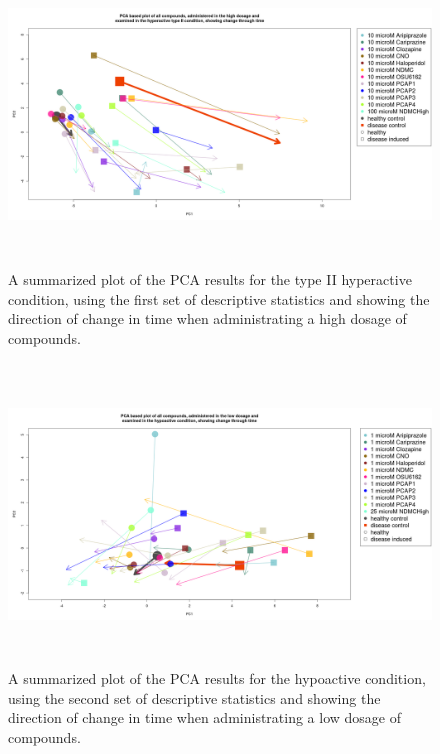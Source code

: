 \documentclass[a4paper,12pt]{article}
\begin{document}
\newpage
\begin{figure}[h!]
\begin{center}
\includegraphics[width=16cm,height=8cm]{All_together_10_microM_DarkPTZ_in_time.png}
\caption{A summarized plot of the PCA results for the type II hyperactive condition, using the first set of descriptive statistics and showing the direction of change in time when administrating a high dosage of compounds.}
\end{center}
\end{figure}
\newpage
\begin{figure}[h!]
\begin{center}
\includegraphics[width=16cm,height=8cm]{All_together_1_microM_DarkApoLow_in_time_set2.png}
\caption{A summarized plot of the PCA results for the hypoactive condition, using the second set of descriptive statistics and showing the direction of change in time when administrating a low dosage of compounds.}
\end{center}
\end{figure}
\end{document}

